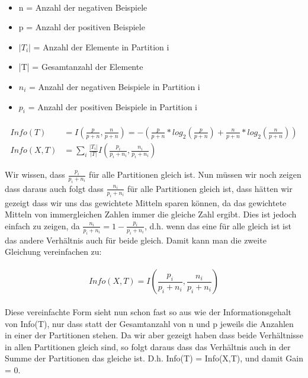 \documentclass{article}
\begin{document}
\paragraph{}
\begin{itemize}
	\item n = Anzahl der negativen Beispiele
	\item p = Anzahl der positiven Beispiele
	\item $|T_i|$ = Anzahl der Elemente in Partition i
	\item |T| = Gesamtanzahl der Elemente
	\item $n_i$ = Anzahl der negativen Beispiele in Partition i
	\item $p_i$ = Anzahl der positiven Beispiele in Partition i
\end{itemize}
\paragraph{}
\begin{align*}
	Info(T) &= I(\frac{p}{p+n},\frac{n}{p+n}) = -(\frac{p}{p+n} * log_2(\frac{p}{p+n}) + \frac{n}{p+n} * log_2(\frac{n}{p+n})) \\
	Info(X,T) &= \sum_i \frac{|T_i|}{|T|} I(\frac{p_i}{p_i+n_i},\frac{n_i}{p_i+n_i})
\end{align*}

Wir wissen, dass $\frac{p_i}{p_i+n_i}$ für alle Partitionen gleich ist. Nun müssen wir noch zeigen dass daraus auch folgt dass $\frac{n_i}{p_i+n_i}$ für alle Partitionen gleich ist, dass hätten wir gezeigt dass wir uns das gewichtete Mitteln sparen können, da das gewichtete Mitteln von immergleichen Zahlen immer die gleiche Zahl ergibt. Dies ist jedoch einfach zu zeigen, da $\frac{n_i}{p_i+n_i} = 1 - \frac{p_i}{p_i+n_i}$, d.h. wenn das eine für alle gleich ist ist das andere Verhältnis auch für beide gleich. Damit kann man die zweite Gleichung vereinfachen zu: 
\paragraph{}
\[
	Info(X,T) = I(\frac{p_i}{p_i+n_i},\frac{n_i}{p_i+n_i})
\]
\paragraph{}
Diese vereinfachte Form sieht nun schon fast so aus wie der Informationsgehalt von Info(T), nur dass statt der Gesamtanzahl von n und p jeweils die Anzahlen in einer der Partitionen stehen. Da wir aber gezeigt haben dass beide Verhältnisse in allen Partitionen gleich sind, so folgt daraus dass das Verhältnis auch in der Summe der Partitionen das gleiche ist. D.h. Info(T) = Info(X,T), und damit Gain = 0.
\end{document}
